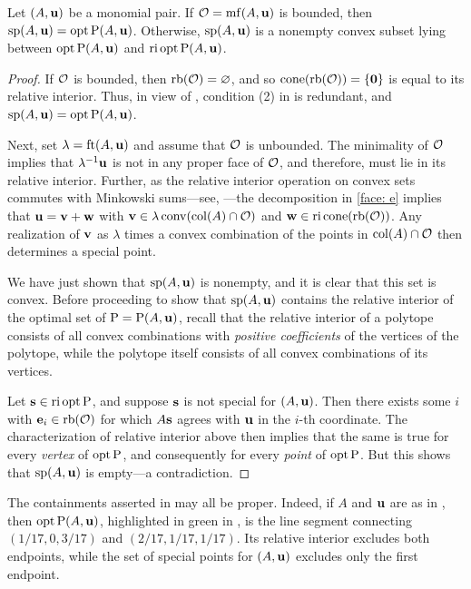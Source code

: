 \documentclass[11pt]{amsart}
\begin{document}
\begin{proposition}
   \label{opt versus mc: P}
   Let $(A,\mathbf{u})$ be a monomial pair.
   If $\mathcal{O} = \operatorname{mf}(A, \mathbf{u})$ is bounded, then $\operatorname{sp}(A, \mathbf{u}) = \operatorname{opt} \mathrm{P}(A, \mathbf{u})$.  Otherwise,  $\operatorname{sp}(A, \mathbf{u})$ is a nonempty convex subset lying between $\operatorname{opt} \mathrm{P}(A, \mathbf{u})$ and $\operatorname{ri} \operatorname{opt} \mathrm{P}(A, \mathbf{u})$.
\end{proposition}

\begin{proof}
   If $\mathcal{O}$ is bounded, then $\operatorname{rb}(\mathcal{O}) = \varnothing$, and so $\operatorname{cone}( \operatorname{rb}(\mathcal{O})) = \{\mathbf{0} \}$ is equal to its relative interior.
   Thus, in view of , condition (2) in  is redundant, and $\operatorname{sp}(A, \mathbf{u}) = \operatorname{opt} \mathrm{P}(A, \mathbf{u})$.
   
   Next, set $\lambda = \operatorname{ft}(A, \mathbf{u})$ and assume that $\mathcal{O}$ is unbounded.
   The minimality of $\mathcal{O}$ implies that $\lambda^{-1}\mathbf{u}$ is not in any proper face of $\mathcal{O}$, and therefore, must lie in its relative interior.  Further, as the relative interior operation on convex sets commutes with Minkowski sums---see, \eg \cite[Theorem 4.10(b)]{vantiel.convex_analysis}---the decomposition in \eqref{face: e}  implies that $\mathbf{u} = \mathbf{v} + \mathbf{w}$ with $\mathbf{v} \in \lambda \operatorname{conv}(\operatorname{col}(A) \cap \mathcal{O})$ and $\mathbf{w} \in \operatorname{ri} \operatorname{cone}(\operatorname{rb}(\mathcal{O}))$.  Any realization of $\mathbf{v}$ as $\lambda$ times a convex combination of the points in $\operatorname{col}(A) \cap \mathcal{O}$ then determines a special point.

 We have just shown that $\operatorname{sp}(A, \mathbf{u})$ is nonempty, and it is clear that this set is convex.
 Before proceeding to show that $\operatorname{sp}(A, \mathbf{u})$ contains the relative interior of the optimal set of $\mathrm{P} = \mathrm{P}(A,\mathbf{u})$,
  recall that the relative interior of a polytope consists of all convex combinations with \emph{positive coefficients} of the vertices of the polytope, while the polytope itself consists of all convex combinations of its vertices.

  Let $\mathbf{s} \in \operatorname{ri} \operatorname{opt} \mathrm{P}$, and suppose $\mathbf{s}$ is not special for $(A,\mathbf{u})$.
  Then there exists some $i$ with $\mathbf{e}_i \in \operatorname{rb}(\mathcal{O})$ for which $A\mathbf{s}$ agrees with $\mathbf{u}$ in the $i$-th coordinate.
  The characterization of relative interior above then implies that the same is true for every \emph{vertex} of $\operatorname{opt} \mathrm{P}$, and consequently for every \emph{point} of $\operatorname{opt} \mathrm{P}$.
  But this shows that $\operatorname{sp}(A,\mathbf{u})$ is empty---a contradiction.
\end{proof}

\begin{example}
   The containments asserted in  may all be proper.
   Indeed, if $A$ and $\mathbf{u}$ are as in , then $\operatorname{opt} \mathrm{P}(A,\mathbf{u})$, highlighted in green in , is the line segment connecting $(1/17, 0, 3/17)$ and $(2/17, 1/17, 1/17)$.
   Its relative interior excludes both endpoints, while the set of special points for $(A,\mathbf{u})$ excludes only the first endpoint.
\end{example}
\end{document}
